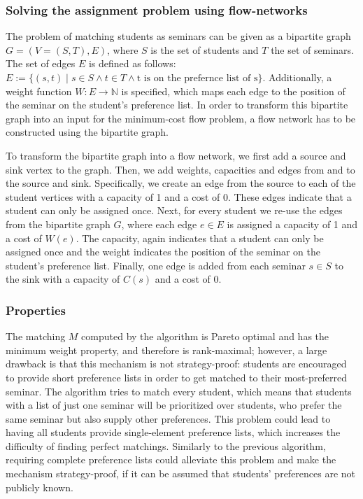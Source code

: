 \subsubsection{Solving the assignment problem using flow-networks}
The problem of matching students as seminars can be given as a bipartite graph $G=(V=(S, T), E)$, where $S$ is the set of students and $T$ the set of seminars. The set of edges $E$ is defined as follows: $E:= \{(s, t) \mid s \in S \land t \in T \land \mbox{t is on the prefernce list of s}\}$. Additionally, a weight function $W: E \rightarrow  \mathbb{N}$ is specified, which maps each edge to the position of the seminar on the student's preference list. In order to transform this bipartite graph into an input for the minimum-cost flow problem, a flow network has to be constructed using the bipartite graph.

To transform the bipartite graph into a flow network, we first add a source and sink vertex to the graph. Then, we add weights, capacities and edges from and to the source and sink. Specifically, we create an edge from the source to each of the student vertices with a capacity of 1 and a cost of 0. These edges indicate that a student can only be assigned once. Next, for every student we re-use the edges from the bipartite graph $G$, where each edge $e \in E$ is assigned a capacity of 1 and a cost of $W(e)$. The capacity, again indicates that a student can only be assigned once and the weight indicates the position of the seminar on the student's preference list. Finally, one edge is added from each seminar $s \in S$ to the sink with a capacity of $C(s)$ and a cost of 0. 

\subsubsection{Properties}
The matching $M$ computed by the algorithm is Pareto optimal \cite{SngThesis} and has the minimum weight property, and therefore is rank-maximal;\cite{SngThesis} however, a large drawback is that this mechanism is not strategy-proof: students are encouraged to provide short preference lists in order to get matched to their most-preferred seminar. The algorithm tries to match every student, which means that students with a list of just one seminar will be prioritized over students, who prefer the same seminar but also supply other preferences. This problem could lead to having all students provide single-element preference lists, which increases the difficulty of finding perfect matchings. Similarly to the previous algorithm, requiring complete preference lists could alleviate this problem and make the mechanism strategy-proof, if it can be assumed that students' preferences are not publicly known.


